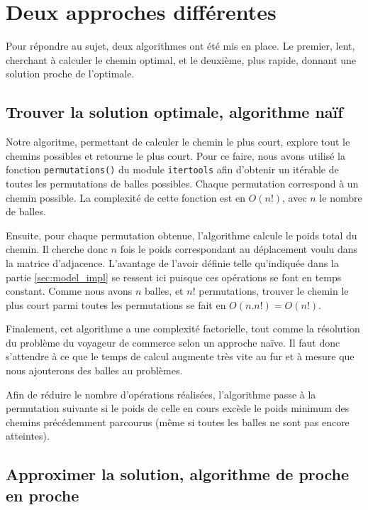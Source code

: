 \documentclass[12pt]{article}
\begin{document}
    \section{Deux approches différentes}
    \label{sec:diff_approch}
    
    Pour répondre au sujet, deux algorithmes ont été mis en place. Le premier, lent, cherchant à calculer le chemin optimal, et le deuxième, plus rapide, donnant une solution proche de l'optimale.

    \subsection{Trouver la solution optimale, algorithme naïf}
    \label{subsec:sol_opti}

    Notre algoritme, permettant de calculer le chemin le plus court, explore tout le chemins possibles et retourne le plus court. Pour ce faire, nous avons utilisé la fonction \verb|permutations()| du module \verb|itertools| afin d'obtenir un itérable de toutes les permutations de balles possibles. Chaque permutation correspond à un chemin possible. La complexité de cette fonction est en $O(n!)$, avec $n$ le nombre de balles.

    Ensuite, pour chaque permutation obtenue, l'algorithme calcule le poids total du chemin. Il cherche donc $n$ fois le poids correspondant au déplacement voulu dans la matrice d'adjacence. L'avantage de l'avoir définie telle qu'indiquée dans la partie \ref{sec:model_impl} se ressent ici puisque ces opérations se font en temps constant. Comme nous avons $n$ balles, et $n!$ permutations, trouver le chemin le plus court parmi toutes les permutations se fait en $O(n.n!) = O(n!)$.

    Finalement, cet algorithme a une complexité factorielle, tout comme la résolution du problème du voyageur de commerce selon un approche naïve. Il faut donc s'attendre à ce que le temps de calcul augmente très vite au fur et à mesure que nous ajouterons des balles au problèmes.

    Afin de réduire le nombre d'opérations réalisées, l'algorithme passe à la permutation suivante si le poids de celle en cours excède le poids minimum des chemins précédemment parcourus (même si toutes les balles ne sont pas encore atteintes).

    \subsection{Approximer la solution, algorithme de proche en proche}
    \label{subsec:sol_approch}
\end{document}
